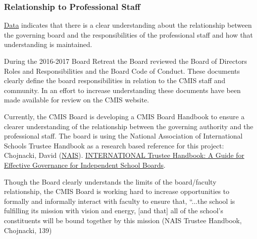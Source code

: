 \subsubsection{Relationship to Professional Staff}



\begin{findings}
\href{https://docs.google.com/a/cmis.ac.th/document/d/1_otvw47y3Z-1CSjXnKhgRTauVRqPl1S6nSdmsb00O2k/edit?usp=sharing}{Data} indicates that there is a clear understanding about the relationship between the governing board and the responsibilities of the professional staff and how that understanding is maintained. 

During the 2016-2017 Board Retreat the Board reviewed the Board of Directors Roles and Responsibilities and the Board Code of Conduct. These documents clearly define the board responsibilities in relation to the CMIS staff and community. In an effort to increase understanding these documents have been made available for review on the CMIS website.

Currently, the CMIS Board is developing a CMIS Board Handbook to ensure a clearer understanding of the relationship between the governing authority and the professional staff. The board is using the National Association of International Schools Trustee Handbook as a research based reference for this project: Chojnacki, David (\href{http://www.nais.org/Articles/Pages/NAIS-Trustee-Handbook-Resources.aspx}{NAIS}). \href{https://www.nais.org/Bookstore/Pages/ProductDetail.aspx?productid=\%7B47CD9104-BC67-E111-9A8C-00505683000D\%7D}{INTERNATIONAL Trustee Handbook: A Guide for Effective Governance for Independent School Boards}. 

Though the Board clearly understands the limits of the board/faculty relationship, the CMIS Board is working hard to increase opportunities to formally and informally interact with faculty to ensure that, “...the school is fulfilling its mission with vision and energy, [and that]  all  of the school’s constituents will be bound together by this mission (NAIS Trustee Handbook, Chojnacki, 139)  


\end{findings}
